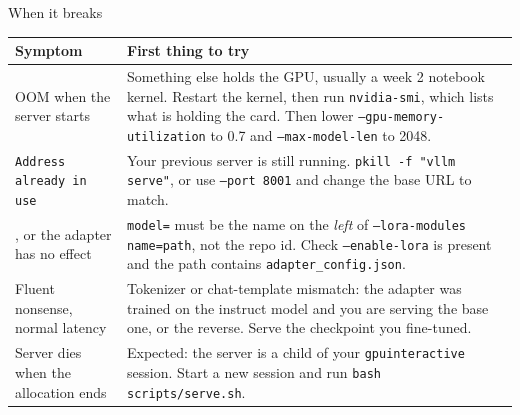 \documentclass[aspectratio=169,10pt]{beamer}
\begin{document}
\begin{frame}{When it breaks}
  \scriptsize
  \begin{tabular}{@{}L{3.4cm} L{7.6cm}@{}}
    \toprule
    \textbf{Symptom} & \textbf{First thing to try}\\
    \midrule
    OOM when the server starts &
      Something else holds the GPU, usually a week 2 notebook kernel.
      Restart the kernel, then run \texttt{nvidia-smi}, which lists what is
      holding the card. Then lower \texttt{--gpu-memory-utilization} to 0.7 and
      \texttt{--max-model-len} to 2048.\\
    \addlinespace[0.3em]
    \texttt{Address already in use} &
      Your previous server is still running. \texttt{pkill -f "vllm serve"}, or
      use \texttt{--port 8001} and change the base URL to match.\\
    , or the adapter has no effect &
      \texttt{model=} must be the name on the \emph{left} of
      \texttt{--lora-modules name=path}, not the repo id. Check
      \texttt{--enable-lora} is present and the path contains
      \texttt{adapter\_config.json}.\\
    \addlinespace[0.3em]
    Fluent nonsense, normal latency &
      Tokenizer or chat-template mismatch: the adapter was trained on the
      instruct model and you are serving the base one, or the reverse. Serve
      the checkpoint you fine-tuned.\\
    \addlinespace[0.3em]
    Server dies when the allocation ends &
      Expected: the server is a child of your
      \texttt{gpuinteractive} session. Start a new session and run
      \texttt{bash scripts/serve.sh}.\\
    \bottomrule
  \end{tabular}
\end{frame}
\end{document}
